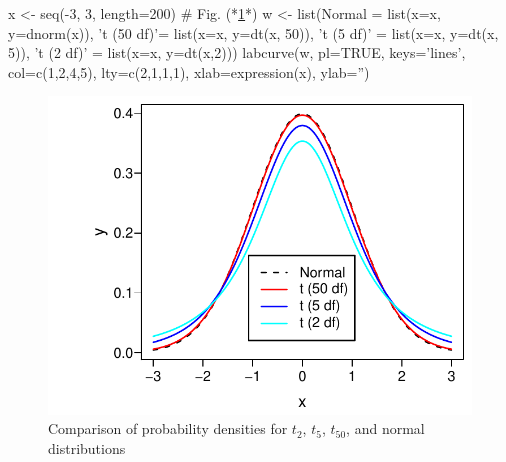 \begin{Schunk}
\begin{Sinput}
x <- seq(-3, 3, length=200)   # Fig. (*\ref{fig:htest-tpdfs}*)
w <- list(Normal     = list(x=x, y=dnorm(x)),
          't (50 df)'= list(x=x, y=dt(x, 50)),
          't (5 df)' = list(x=x, y=dt(x, 5)),
          't (2 df)' = list(x=x, y=dt(x,2)))
labcurve(w, pl=TRUE, keys='lines', col=c(1,2,4,5), lty=c(2,1,1,1),
         xlab=expression(x), ylab='')
\end{Sinput}
\begin{figure}[htbp]

\centerline{\includegraphics[width=\maxwidth]{htest-tpdfs-1} }

\caption[$t$ distribution for varying d.f.]{Comparison of probability densities for $t_2$, $t_5$, $t_{50}$, and normal distributions}\label{fig:htest-tpdfs}
\end{figure}
\end{Schunk}

